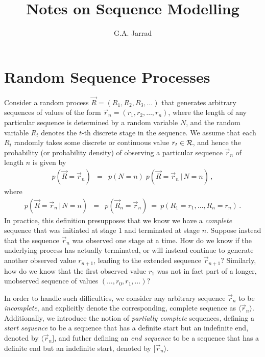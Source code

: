 \documentclass[a4paper]{article}
\title{Notes on Sequence Modelling}
\author{G.A. Jarrad}
\begin{document}
\maketitle
{}
\section{Random Sequence Processes}
\label{sec:random-processes}
Consider a random process $\vec{R}=(R_1,R_2,R_3,\ldots)$ that generates arbitrary sequences of values
of the form $\vec{r}_n=(r_1,r_2,\ldots,r_n)$, where the length of any particular sequence is 
determined by a random variable $N$,
and the random variable $R_t$ denotes the $t$-th discrete stage in the sequence.
We assume that each $R_t$ randomly takes some discrete or continuous value $r_t\in{\cal R}$,
and hence the probability (or probability density) of observing a particular
sequence $\vec{r}_n$ of length $n$ is given by
\begin{eqnarray}
   p(\vec{R}=\vec{r}_n) & = & p(N=n)\; p(\vec{R}=\vec{r}_n\,|\,N=n)\,,
\end{eqnarray}
where
\begin{eqnarray}
p(\vec{R}=\vec{r}_n\,|\,N=n)
& = & p(\vec{R}_n=\vec{r}_n)~=~p(R_1=r_1,\ldots,R_n=r_n)\,.
\end{eqnarray}
In practice, this definition presupposes that we know we have a {\em complete} sequence that was initiated
at stage 1 and terminated at stage $n$.
Suppose instead that the sequence $\vec{r}_n$ was observed one stage at a time. How do we know if the
underlying process has actually terminated, or will instead
continue to generate another observed value
$r_{n+1}$, leading to the extended sequence $\vec{r}_{n+1}$? 
Similarly, how do we know that the first observed value $r_1$ was not in fact
part of a longer, unobserved sequence of values $(\ldots,r_0,r_1,\ldots)$?

In order to handle such difficulties, we consider any arbitrary sequence $\vec{r}_n$ to be {\em incomplete},
and explicitly denote the corresponding, complete sequence as $\langle\vec{r}_n\rangle$.
Additionally, we introduce the notion of {\em partially complete} sequences, 
defining a {\em start sequence} to be a sequence that has a definite start but an indefinite end,
denoted by $\langle\vec{r}_n]$, and futher defining an {\em end sequence} to be a sequence
that has a definite end but an indefinite start, denoted by $[\vec{r}_n\rangle$.
\end{document}
